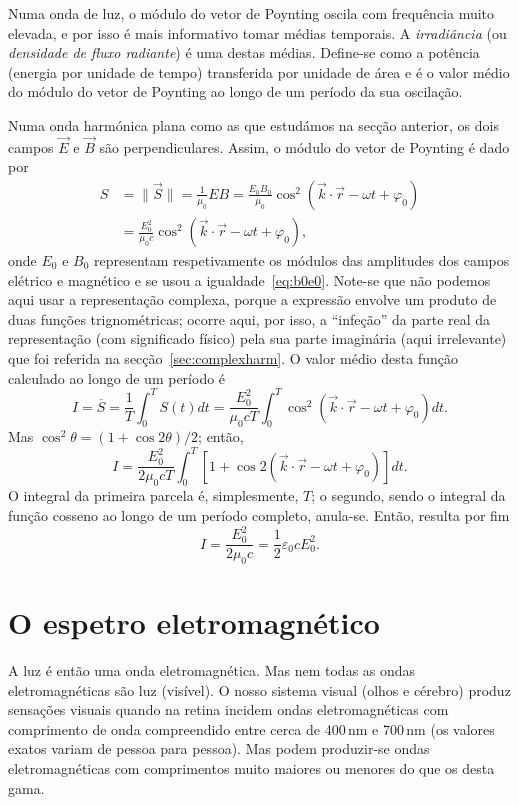 Numa onda de luz, o módulo do vetor de Poynting oscila com frequência muito
elevada, e por isso é mais informativo tomar médias temporais. A
\emph{irradiância} (ou \emph{densidade de fluxo radiante}) é uma destas médias.
Define-se como a potência (energia por unidade de tempo) transferida por unidade
de área e é o valor médio do módulo do vetor de Poynting ao longo de um período
da sua oscilação.

Numa onda harmónica plana como as que estudámos na secção anterior, os dois
campos $\vec E$ e $\vec B$ são perpendiculares. Assim, o módulo do vetor de
Poynting é dado por
\begin{align*}
  S&=\|\vec S\|=\frac{1}{\mu_0}EB=
  \frac{E_0B_0}{\mu_0}\cos^2\left(\vec k\cdot\vec r-\omega t+\varphi_0\right)\\
  &=
  \frac{E^2_0}{\mu_0c}\cos^2\left(\vec k\cdot\vec r-\omega t+\varphi_0\right),
\end{align*}
onde $E_0$ e $B_0$ representam respetivamente os módulos das amplitudes dos
campos elétrico e magnético e se usou a igualdade~\eqref{eq:b0e0}. Note-se que
não podemos aqui usar a representação complexa, porque a expressão envolve um
produto de duas funções trignométricas; ocorre aqui, por isso, a ``infeção'' da
parte real da representação (com significado físico) pela sua parte imaginária
(aqui irrelevante) que foi referida na secção~\ref{sec:complexharm}.  O
valor médio desta função calculado ao longo de um período é
\begin{equation*}
  I=\overline S=\frac{1}{T}\int_{0}^TS(t)dt=\frac{E_0^2}{\mu_0cT}
  \int_0^T\cos^2\left(\vec k\cdot\vec r-\omega t+\varphi_0\right)dt.
\end{equation*}
Mas $\cos^2\theta=(1+\cos2\theta)/2$; então,
\begin{equation*}
  I=\frac{E_0^2}{2\mu_0cT}
  \int_0^T\left[1+\cos2\left(\vec k\cdot\vec r-\omega t+\varphi_0\right)\right]dt.
\end{equation*}
O integral da primeira parcela é, simplesmente, $T$; o segundo, sendo o integral
da função cosseno ao longo de um período completo, anula-se. Então, resulta por
fim
\begin{equation}
  I=\frac{E_0^2}{2\mu_0c}=\frac{1}{2}\varepsilon_0cE_0^2.
\end{equation}



\section{O espetro eletromagnético}
A luz é então uma onda eletromagnética. Mas nem todas as ondas eletromagnéticas
são luz (visível). O nosso sistema visual (olhos e cérebro) produz sensações
visuais quando na retina incidem ondas eletromagnéticas com comprimento de onda
compreendido entre cerca de 400\,nm e 700\,nm (os valores exatos variam de
pessoa para pessoa). Mas podem produzir-se ondas eletromagnéticas com
comprimentos muito maiores ou menores do que os desta gama.

